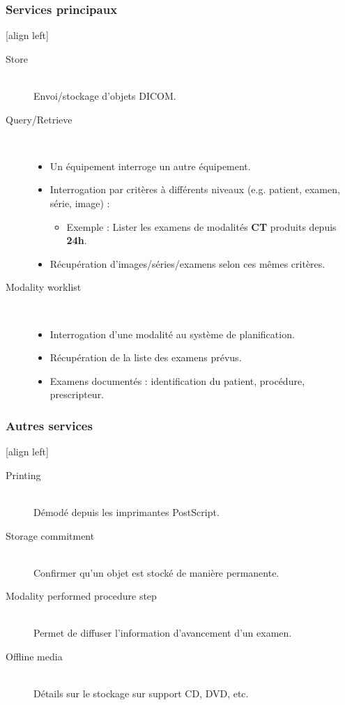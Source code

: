 \frame
{
	\frametitle{Services principaux}
	[align left]
	\begin{description}
		\item[Store]~\\
		Envoi/stockage d'objets DICOM.
		\item[Query/Retrieve]~\\
		\begin{itemize}
			\item Un \'equipement interroge un autre \'equipement.
			\item Interrogation par crit\`eres \`a diff\'erents niveaux (e.g. patient, examen, s\'erie, image) :
			\begin{itemize}
				\item Exemple : Lister les examens de modalit\'es \textbf{CT} produits depuis \textbf{24h}.
			\end{itemize}
			\item R\'ecup\'eration d'images/s\'eries/examens selon ces m\^emes crit\`eres.
		\end{itemize}
		\item[Modality worklist]~\\
		\begin{itemize}
			\item Interrogation d'une modalit\'e au syst\`eme de planification.
			\item R\'ecup\'eration de la liste des examens pr\'evus.
			\item Examens document\'es : identification du patient, proc\'edure, prescripteur.
		\end{itemize}
	\end{description}
}

\frame
{
	\frametitle{Autres services}
	[align left]
	\begin{description}
		\item[Printing]~\\
		D\'emod\'e depuis les imprimantes PostScript.
		\item[Storage commitment]~\\
		Confirmer qu'un objet est stock\'e de mani\`ere permanente.
		\item[Modality performed procedure step]~\\
		Permet de diffuser l'information d'avancement d'un examen.
		\item[Offline media]~\\
		D\'etails sur le stockage sur support CD, DVD, etc.
	\end{description}
}

